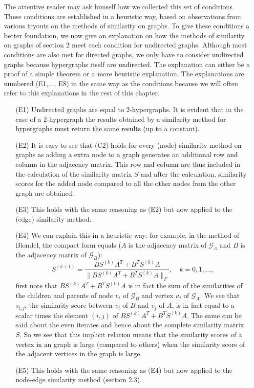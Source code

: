 \documentclass[a4paper,11pt]{report}
\newcommand{\graf}{\mathscr{G}}
\begin{document}
The attentive reader may ask himself how we collected this set of conditions. 
These conditions are established in a heuristic way, based on observations from 
various tryouts on the methods of similarity on graphs. To give these conditions 
a better foundation, we now give an explanation on how the methods of similarity on graphs of
section 2 meet each condition for undirected graphs. Although most conditions are also met for
directed graphs,  we only have to consider undirected graphs
because hypergraphs itself are undirected. The explanation can either be a proof of a simple 
theorem or a more heuristic explanation. The explanations are numbered (E1,$\ldots$, E8) 
in the same way as the conditions because we will often refer to this 
explanations in the rest of this chapter. 

\begin{itemize}
  \item[(E1)] Undirected graphs are equal to $2$-hypergraphs. It is evident that 
  in the case of a $2$-hypergraph the results obtained by a similarity method 
  for hypergraphs must return the same results (up to a constant).
   \item[(E2)] It is easy to see that (C2) holds for every (node) similarity method on 
   graphs as adding a extra node to a graph generates an additional row and 
   column in the adjacency matrix. This row and column are thus included in the 
   calculation of the similarity matrix $S$ and after the calculation, similarity 
   scores for the added node compared to all the other nodes from the other graph are 
   obtained.
  \item[(E3)] This holds with the same reasoning as (E2) but now applied to the (edge) similarity method.
  \item[(E4)] We can explain this in a heuristic way: for example, in the method 
  of Blondel, the compact form equals ($A$ is the adjacency matrix of $\graf_A$ and $B$ is the adjacency
  matrix of $\graf_B$):
  $$S^{(k+1)} = \frac{BS^{(k)}A^T + B^TS^{(k)}A}{\|BS^{(k)}A^T + B^TS^{(k)}A\|_F},\quad 
  k=0,1,\ldots,$$
first note that $BS^{(k)}A^T + B^TS^{(k)}A$ is in fact the sum of the 
similarities of the children and parents of node $v_i$ of $\graf_B$ and vertex $v_j$ 
of $\graf_A$. We see that $s_{i,j}$, the similarity score between $v_i$ of $B$ and $v_j$ of $A$, is in fact
 equal to a scalar times the element $(i,j)$ of $BS^{(k)}A^T + B^TS^{(k)}A$. The same can be said about the even iterates and hence about
 the complete similarity matrix $S$. So we see that this implicit relation means that the similarity scores
 of a vertex in an graph is large (compared to others) when the similarity score 
  of the adjacent vertices in the graph is large.
  \item[(E5)] This holds with the same reasoning as (E4) but now applied to the node-edge similarity method (section 2.3). 
  


\end{itemize}
\end{document}
